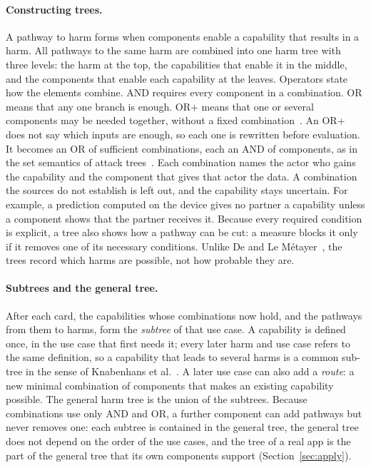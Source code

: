 \paragraph{Constructing trees.} A pathway to harm forms when components enable a capability
that results in a harm. All pathways to the same harm are combined into one harm tree with
three levels: the harm at the top, the capabilities that enable it in the middle, and the
components that enable each capability at the leaves. Operators state how the elements
combine. AND requires every component in a combination. OR means that any one branch is
enough. OR+ means that one or several components may be needed together, without a fixed
combination~\parencite[\S4.1]{knabenhans2026harms}. An OR+ does not say which inputs are
enough, so each one is rewritten before evaluation. It becomes an OR of sufficient
combinations, each an AND of components, as in the set semantics of attack
trees~\parencite{mauw2005foundations}. Each combination names the actor who gains the
capability and the component that gives that actor the data. A combination the sources do not
establish is left out, and the capability stays uncertain. For example, a prediction computed
on the device gives no partner a capability unless a component shows that the partner receives
it.
Because every required condition is explicit, a tree also shows how a pathway can be cut: a
measure blocks it only if it removes one of its necessary conditions. Unlike De and Le
Métayer~\parencite[Sec.~IV-B]{de2016privacy}, the trees record which harms are possible, not
how probable they are.

\paragraph{Subtrees and the general tree.} After each card, the capabilities whose combinations
now hold, and the pathways from them to harms, form the \emph{subtree} of that use case. A
capability is defined once, in the use case that first needs it; every later harm and use case
refers to the same definition, so a capability that leads to several harms is a common sub-tree
in the sense of Knabenhans et al.~\parencite[\S4.2]{knabenhans2026harms}. A later use case can
also add a \emph{route}: a new minimal combination of components that makes an existing
capability possible. The general harm tree is the union of the subtrees. Because combinations
use only AND and OR, a further component can add pathways but never removes one: each subtree is
contained in the general tree, the general tree does not depend on the order of the use cases,
and the tree of a real app is the part of the general tree that its own components support
(Section~\ref{sec:apply}).

